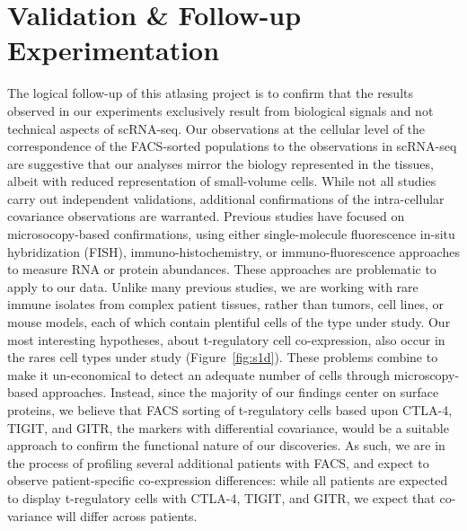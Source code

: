 \section{Validation \& Follow-up Experimentation}
The logical follow-up of this atlasing project is to confirm that the results observed in our experiments exclusively result from biological signals and not technical aspects of scRNA-seq. 
Our observations at the cellular level of the correspondence of the FACS-sorted populations to the observations in scRNA-seq are suggestive that our analyses mirror the biology represented in the tissues, albeit with reduced representation of small-volume cells. 
While not all studies carry out independent validations, additional confirmations of the intra-cellular covariance observations are warranted. %
Previous studies \citep{Shalek2013,Shalek2014} have focused on microsocopy-based confirmations, using either single-molecule fluorescence in-situ hybridization (FISH), immuno-histochemistry, or immuno-fluorescence approaches to measure RNA or protein abundances. 
These approaches are problematic to apply to our data. 
Unlike many previous studies, we are working with rare immune isolates from complex patient tissues, rather than tumors, cell lines, or mouse models, each of which contain plentiful cells of the type under study.
Our most interesting hypotheses, about t-regulatory cell co-expression, also occur in the rares cell types under study (Figure~\ref{fig:s1d}). These problems combine to make it un-economical to detect an adequate number of cells through microscopy-based approaches. 
Instead, since the majority of our findings center on surface proteins, we believe that FACS sorting of t-regulatory cells based upon CTLA-4, TIGIT, and GITR, the markers with differential covariance, would be a suitable approach to confirm the functional nature of our discoveries. 
As such, we are in the process of profiling several additional patients with FACS, and expect to observe patient-specific co-expression differences: while all patients are expected to display t-regulatory cells with CTLA-4, TIGIT, and GITR, we expect that co-variance will differ across patients.  

